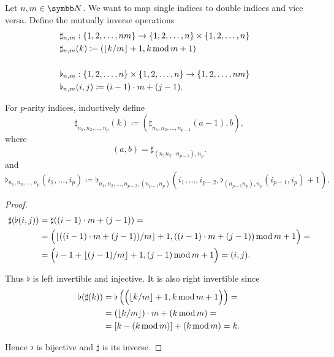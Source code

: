 \begin{definition}\label{def:double_index_maps}
  Let \( n, m \in \BB{N} \). We want to map single indices to double indices and vice versa. Define the mutually inverse operations
  \begin{align*}
    &\sharp_{n,m}: \{ 1, 2, \ldots, nm \} \to \{ 1, 2, \ldots, n \} \times \{ 1, 2, \ldots, n \} \\
    &\sharp_{n,m}(k) \coloneqq (\lfloor k / m \rfloor + 1, k \operatorname{mod} m + 1)
    &\\
    &\\
    &\flat_{n,m}: \{ 1, 2, \ldots, n \} \times \{ 1, 2, \ldots, n \} \to \{ 1, 2, \ldots, nm \} \\
    &\flat_{n,m}(i, j) \coloneqq (i - 1) \cdot m + (j - 1).
  \end{align*}

  For \( p \)-arity indices, inductively define
  \begin{equation*}
    \sharp_{n_1, n_2, \ldots, n_p}(k) \coloneqq (\sharp_{n_1, n_2, \ldots, n_{p-1}}(a - 1), b),
  \end{equation*}
  where
  \begin{equation*}
    (a, b) = \sharp_{(n_1 n_2 \cdots n_{p-1}), n_p}.
  \end{equation*}
  and
  \begin{equation*}
    \flat_{n_1, n_2, \ldots, n_p}(i_1, \ldots, i_p) \coloneqq \flat_{n_1, n_2, \ldots, n_{p-2}, (n_{p-1} n_p)}(i_1, \ldots, i_{p-2}, \flat_{(n_{p-1} n_p), n_p}(i_{p-1}, i_p) + 1).
  \end{equation*}
\end{definition}
\begin{proof}
  \begin{align*}
    \sharp(\flat(i, j))
    &=
    \sharp((i - 1) \cdot m + (j - 1))
    = \\ &=
    \Big( \lfloor ((i - 1) \cdot m + (j - 1)) / m \rfloor + 1, ((i - 1) \cdot m + (j - 1)) \operatorname{mod} m + 1\Big)
    = \\ &=
    \Big( i - 1 + \lfloor (j - 1) / m \rfloor + 1, (j - 1) \operatorname{mod} m + 1 \Big)
    =
    (i, j).
  \end{align*}

  Thus \( \flat \) is left invertible and injective. It is also right invertible since
  \begin{align*}
    \flat(\sharp(k))
    &=
    \flat\left( \Big( \lfloor k / m \rfloor + 1, k \operatorname{mod} m + 1 \Big) \right)
    = \\ &=
    (\lfloor k / m \rfloor) \cdot m + (k \operatorname{mod} m)
    = \\ &=
    [k - (k \operatorname{mod} m)] + (k \operatorname{mod} m)
    =
    k.
  \end{align*}

  Hence \( \flat \) is bijective and \( \sharp \) is its inverse.
\end{proof}

